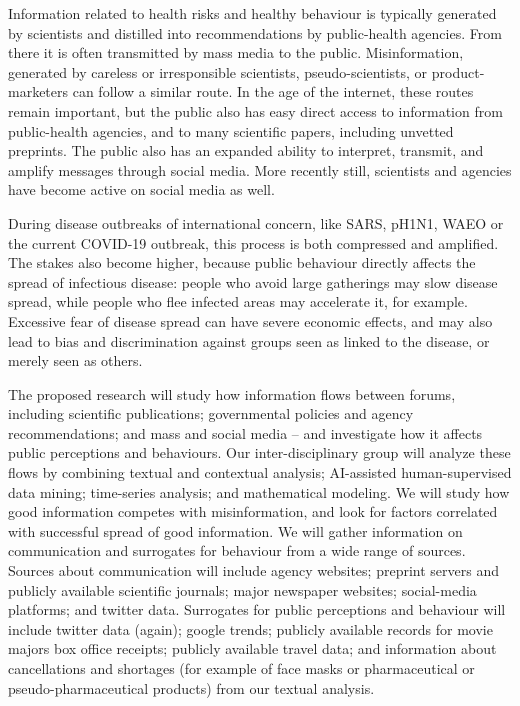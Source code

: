 
\proptitle{\fulltitle}


Information related to health risks and healthy behaviour is typically generated by scientists and distilled into recommendations by public-health agencies. From there it is often transmitted by mass media to the public. Misinformation, generated by careless or irresponsible scientists, pseudo-scientists, or product-marketers can follow a similar route. In the age of the internet, these routes remain important, but the public also has easy direct access to information from public-health agencies, and to many scientific papers, including unvetted preprints. The public also has an expanded ability to interpret, transmit, and amplify messages through social media. More recently still, scientists and agencies have become active on social media as well.

During disease outbreaks of international concern, like SARS, pH1N1, WAEO  or the current COVID-19 outbreak, this process is both compressed and amplified. The stakes also become higher, because public behaviour directly affects the spread of infectious disease: people who avoid large gatherings may slow disease spread, while people who flee infected areas may accelerate it, for example. Excessive fear of disease spread can have severe economic effects, and may also lead to bias and discrimination against groups seen as linked to the disease, or merely seen as others.

The proposed research will study how information flows between forums, including scientific publications; governmental policies and agency recommendations; and mass and social media -- and investigate how it affects public perceptions and behaviours. 
Our inter-disciplinary group will analyze these flows by combining textual and contextual analysis; AI-assisted human-supervised data mining; time-series analysis; and mathematical modeling. We will study how good information competes with misinformation, and look for factors correlated with successful spread of good information. 
We will gather information on communication and surrogates for behaviour from a wide range of sources. 
Sources about communication will include agency websites; preprint servers and publicly available scientific journals; major newspaper websites; social-media platforms; and twitter data.
Surrogates for public perceptions and behaviour will include twitter data (again); google trends; publicly available records for movie majors box office receipts; publicly available travel data; and information about cancellations and shortages (for example of face masks or pharmaceutical or pseudo-pharmaceutical products) from our textual analysis. 


